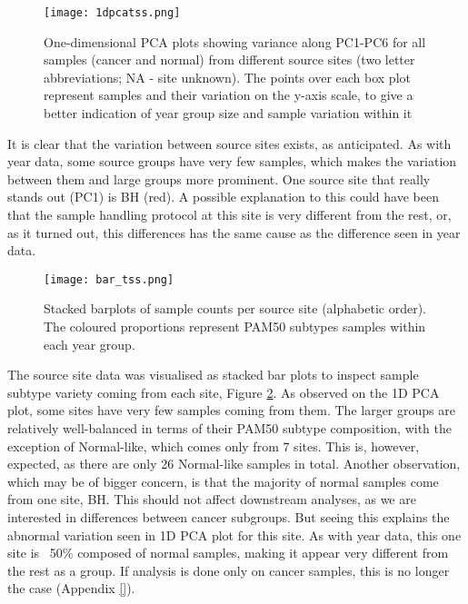             \begin{figure}[!h]
            \centering
            \texttt{[image: 1dpcatss.png]}
            \caption{One-dimensional PCA plots showing variance along PC1-PC6 for all samples (cancer and normal) from different source sites (two letter abbreviations; NA - site unknown). The points over each box plot represent samples and their variation on the y-axis scale, to give a better indication of year group size and sample variation within it}
            \label{fig:1dpcatss}
            \end{figure}

    It is clear that the variation between source sites exists, as anticipated. As with year data, some source groups have very few samples, which makes the variation between them and large groups more prominent. One source site that really stands out (PC1) is BH (red). A possible explanation to this could have been that the sample handling protocol at this site is very different  from the rest, or, as it turned out, this differences has the same cause as the difference seen in year data.\\
    
            \begin{figure}[!h]
            \centering
            \texttt{[image: bar\_tss.png]}
            \caption{Stacked barplots of sample counts per source site (alphabetic order). The coloured proportions represent PAM50 subtypes samples within each year group. }
            \label{fig:bartss}
            \end{figure}
    
    The source site data was visualised as stacked bar plots to inspect sample subtype variety coming from each site, Figure \ref{fig:bartss}. As observed on the 1D PCA plot, some sites have very few samples coming from them. The larger groups are relatively well-balanced in terms of their PAM50 subtype composition, with the exception of Normal-like, which comes only from 7 sites. This is, however, expected, as there are only 26 Normal-like samples in total. Another observation, which may be of bigger concern, is that the majority of normal samples come from one site, BH. This should not affect downstream analyses, as we are interested in differences between cancer subgroups. But seeing this explains the abnormal variation seen in 1D PCA plot for this site. As with year data, this one site is ~50\% composed of normal samples, making it appear very different from the rest as a group. If analysis is done only on cancer samples, this is no longer the case (Appendix \ref{}). 
    
